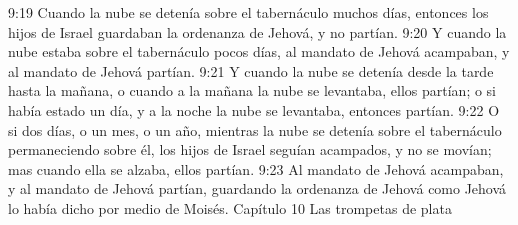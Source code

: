 9:19 Cuando la nube se detenía sobre el tabernáculo muchos días, entonces los hijos de Israel guardaban la ordenanza de Jehová, y no partían.  
9:20 Y cuando la nube estaba sobre el tabernáculo pocos días, al mandato de Jehová acampaban, y al mandato de Jehová partían.  
9:21 Y cuando la nube se detenía desde la tarde hasta la mañana, o cuando a la mañana la nube se levantaba, ellos partían; o si había estado un día, y a la noche la nube se levantaba, entonces partían.  
9:22 O si dos días, o un mes, o un año, mientras la nube se detenía sobre el tabernáculo permaneciendo sobre él, los hijos de Israel seguían acampados, y no se movían; mas cuando ella se alzaba, ellos partían.  
9:23 Al mandato de Jehová acampaban, y al mandato de Jehová partían, guardando la ordenanza de Jehová como Jehová lo había dicho por medio de Moisés.  
Capítulo 10
Las trompetas de plata 

